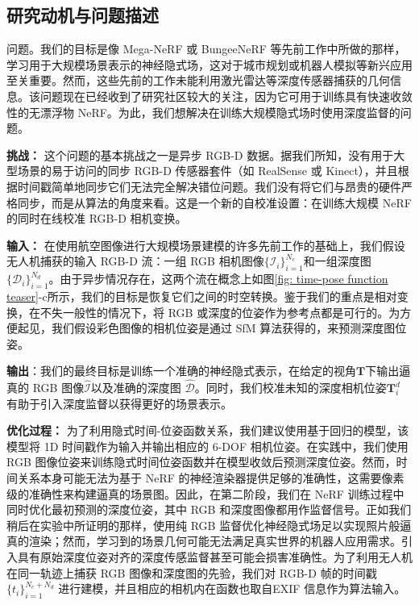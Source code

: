 \subsection{研究动机与问题描述}
问题。我们的目标是像 Mega-NeRF\cite{turki_mega-nerf_2022} 或 BungeeNeRF\cite{xiangli_bungeenerf_2022} 等先前工作中所做的那样，学习用于大规模场景表示的神经隐式场，这对于城市规划或机器人模拟等新兴应用至关重要。然而，这些先前的工作未能利用激光雷达等深度传感器捕获的几何信息。该问题现在已经收到了研究社区较大的关注\cite{deng_depth-supervised_2022,roessle_dense_2022}，因为它可用于训练具有快速收敛性的无漂浮物 NeRF。为此，我们想解决在训练大规模隐式场时使用深度监督的问题。

\textbf{挑战：}
这个问题的基本挑战之一是异步 RGB-D 数据。据我们所知，没有用于大型场景的易于访问的同步 RGB-D 传感器套件（如 RealSense 或 Kinect），并且根据时间戳简单地同步它们无法完全解决错位问题。我们没有将它们与昂贵的硬件严格同步，而是从算法的角度来看。这是一个新的自校准设置：在训练大规模 NeRF 的同时在线校准 RGB-D 相机变换。

\textbf{输入：} 在使用航空图像进行大规模场景建模的许多先前工作的基础上\cite{turki_mega-nerf_2022,xiangli_bungeenerf_2022}，我们假设无人机捕获的输入 RGB-D 流：一组 RGB 相机图像$\{\mathcal{I}_i\}_{i=1}^{N_c}$和一组深度图$\{\mathcal{D}_i\}_{i=1}^{N_d}$。由于异步情况存在，这两个流在概念上如图\ref{fig: time-pose function teaser}-c所示，我们的目标是恢复它们之间的时空转换。鉴于我们的重点是相对变换，在不失一般性的情况下，将 RGB 或深度的位姿作为参考点都是可行的。为方便起见，我们假设彩色图像的相机位姿是通过 SfM 算法获得的，来预测深度图位姿。

\textbf{输出}：我们的最终目标是训练一个准确的神经隐式表示，在给定的视角$\mathbf{T}$下输出逼真的 RGB 图像$\hat{\mathcal{I}}$以及准确的深度图 $\hat{\mathcal{D}}$。同时，我们校准未知的深度相机位姿$\mathbf{T}_i^d$ 有助于引入深度监督以获得更好的场景表示。

\textbf{优化过程：}
为了利用隐式时间-位姿函数关系，我们建议使用基于回归的模型，该模型将 1D 时间戳作为输入并输出相应的 6-DOF 相机位姿。在实践中，我们使用 RGB 图像位姿来训练隐式时间位姿函数并在模型收敛后预测深度位姿。然而，时间关系本身可能无法为基于 NeRF 的神经渲染器提供足够的准确性，这需要像素级的准确性来构建逼真的场景图。因此，在第二阶段，我们在 NeRF 训练过程中同时优化最初预测的深度位姿，其中 RGB 和深度图像都用作监督信号。正如我们稍后在实验中所证明的那样，使用纯 RGB 监督优化神经隐式场足以实现照片般逼真的渲染；然而，学习到的场景几何可能无法满足真实世界的机器人应用需求。引入具有原始深度位姿对齐的深度传感监督甚至可能会损害准确性。为了利用无人机在同一轨迹上捕获 RGB 图像和深度图的先验，我们对 RGB-D 帧的时间戳$\{t_i\}_{i=1}^{N_c+N_d}$ 进行建模，并且相应的相机内在函数也取自EXIF 信息作为算法输入。

